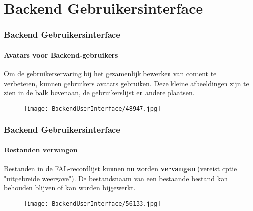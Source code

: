 %

\section{Backend Gebruikersinterface}

\begin{frame}[fragile]
	\frametitle{Backend Gebruikersinterface}
	\framesubtitle{Avatars voor Backend-gebruikers}

	Om de gebruikerservaring bij het gezamenlijk bewerken van content te verbeteren, kunnen gebruikers
	avatars gebruiken. Deze kleine afbeeldingen zijn te zien in de balk bovenaan, de gebruikerslijst
	en andere plaatsen.

	\begin{figure}
		\texttt{[image: BackendUserInterface/48947.jpg]}
	\end{figure}

\end{frame}

\begin{frame}[fragile]
	\frametitle{Backend Gebruikersinterface}
	\framesubtitle{Bestanden vervangen}

	Bestanden in de FAL-recordlijst kunnen nu worden \textbf{vervangen} (vereist optie "uitgebreide weergave").
	De bestandsnaam van een bestaande bestand kan behouden blijven of kan worden bijgewerkt.

	\begin{figure}
		\texttt{[image: BackendUserInterface/56133.jpg]}
	\end{figure}

\end{frame}


